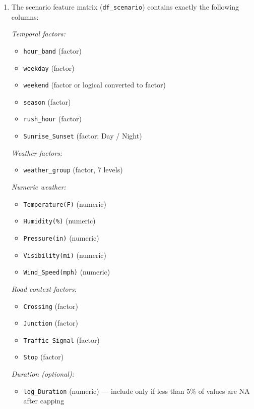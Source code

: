 \documentclass[11pt]{article}
\begin{document}
\begin{enumerate}
  \item The scenario feature matrix (\texttt{df\_scenario}) contains exactly the following columns:

  \textit{Temporal factors:}
  \begin{itemize}
    \item \texttt{hour\_band} (factor)
    \item \texttt{weekday} (factor)
    \item \texttt{weekend} (factor or logical converted to factor)
    \item \texttt{season} (factor)
    \item \texttt{rush\_hour} (factor)
    \item \texttt{Sunrise\_Sunset} (factor: Day / Night)
  \end{itemize}

  \textit{Weather factors:}
  \begin{itemize}
    \item \texttt{weather\_group} (factor, 7 levels)
  \end{itemize}

  \textit{Numeric weather:}
  \begin{itemize}
    \item \texttt{Temperature(F)} (numeric)
    \item \texttt{Humidity(\%)} (numeric)
    \item \texttt{Pressure(in)} (numeric)
    \item \texttt{Visibility(mi)} (numeric)
    \item \texttt{Wind\_Speed(mph)} (numeric)
  \end{itemize}

  \textit{Road context factors:}
  \begin{itemize}
    \item \texttt{Crossing} (factor)
    \item \texttt{Junction} (factor)
    \item \texttt{Traffic\_Signal} (factor)
    \item \texttt{Stop} (factor)
  \end{itemize}

  \textit{Duration (optional):}
  \begin{itemize}
    \item \texttt{log\_Duration} (numeric) --- include only if less than 5\% of values are NA after capping
  \end{itemize}


\end{enumerate}
\end{document}
